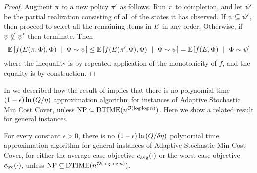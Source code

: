 \begin{proof}
Augment $\pi$ to a new policy $\pi'$ as follows.
Run $\pi$ to completion, and let ${\color{black}{\ensuremath{\psi}}}'$ be the partial
realization consisting of all of the states it has observed.  If ${\color{black}{\ensuremath{\psi}}} \subseteq {\color{black}{\ensuremath{\psi}}}'$, 
then proceed to select all the remaining items in $E$ in any
order.  Otherwise, if ${\color{black}{\ensuremath{\psi}}} \nsubseteq {\color{black}{\ensuremath{\psi}}}'$ then terminate.
Then %
\begin{equation}
  \label{eq:2app-wc}
  \mathbb{E}\left[f(E({\pi}, {{\color{black}{\ensuremath{\Phi}}}}), {\color{black}{\ensuremath{\Phi}}})\  \mid \ {\color{black}{\ensuremath{\Phi}}} \sim {\color{black}{\ensuremath{\psi}}}\right] \le
\mathbb{E}\left[f(E({\pi'}, {{\color{black}{\ensuremath{\Phi}}}}), {\color{black}{\ensuremath{\Phi}}})\  \mid \ {\color{black}{\ensuremath{\Phi}}} \sim {\color{black}{\ensuremath{\psi}}}\right]  =
\mathbb{E}\left[f(E,
  {\color{black}{\ensuremath{\Phi}}}) \  \mid \ {\color{black}{\ensuremath{\Phi}}} \sim {\color{black}{\ensuremath{\psi}}}\right] 
\end{equation}
where the inequality is by repeated application of the \term monotonicity of $f$, and the equality
is by construction.
\end{proof}




%
%
%


In  we described how the
result of
\citet{feige98threshold} implies that there is
no polynomial time
\mbox{$(1-\epsilon)\ln  \left( {Q/\eta} \right) $} approximation algorithm for
\certifying instances of 
Adaptive Stochastic Min Cost Cover, unless $\textrm{NP}\subseteq
\text{DTIME}(n^{{\mathcal{O}}(\log\log n)})$.  Here we show a related result
for general instances.

\begin{lemma} \label{lem:approx-hardness-for-c_avg}
For every constant $\epsilon > 0$, there is no $(1-\epsilon)\ln  \left( {Q/\delta\eta} \right) $ polynomial time approximation
algorithm for general instances of 
Adaptive Stochastic Min Cost Cover, for either the average case
objective ${c_{\text{avg}}{(\cdot)}}$ or the worst-case objective ${c_{\text{wc}}{(\cdot)}}$, 
 unless $\textrm{NP}\subseteq
\text{DTIME}(n^{{\mathcal{O}}(\log\log n)})$. 
\end{lemma}

